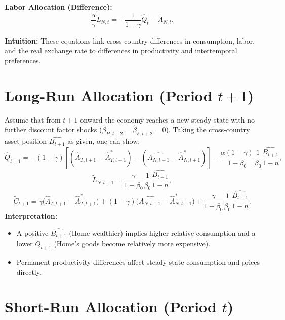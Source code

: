 \documentclass[a4paper,12pt]{article} %
\theoremstyle{nonitalic}
\begin{document}
\textbf{Labor Allocation (Difference):}
\[
\frac{\alpha}{\gamma} \tilde{L}_{N,t} = -\frac{1}{1-\gamma} \hat{Q}_t - \tilde{A}_{N,t}. \tag{9d}
\]

\textbf{Intuition:} These equations link cross-country differences in consumption, labor, and the real exchange rate to differences in productivity and intertemporal preferences.

\section{Long-Run Allocation (Period $t+1$)}

Assume that from $ t+1 $ onward the economy reaches a new steady state with no further discount factor shocks ($ \hat{\beta}_{H,t+2} = \hat{\beta}_{F,t+2} = 0 $). Taking the cross-country asset position $ \widehat{B_{t+1}} $ as given, one can show:
\[
\hat{Q}_{t+1} = - (1-\gamma)\left[(\hat{A}_{T,t+1}-\hat{A}^*_{T,t+1}) - ( \widehat{A_{N,t+1}}-\hat{A}^*_{N,t+1})\right] - \frac{\alpha(1-\gamma)}{1-\beta_0}\frac{1}{\beta_0}\frac{\widehat{B_{t+1}}}{1-n},
\]
\[
\tilde{L}_{N,t+1} = \frac{\gamma}{1-\beta_0}\frac{1}{\beta_0}\frac{\widehat{B_{t+1}}}{1-n},
\]
\[
\tilde{C}_{t+1} = \gamma\big(\hat{A}_{T,t+1}-\hat{A}^*_{T,t+1}\big) + (1-\gamma)\big( \widehat{A_{N,t+1}}-\hat{A}^*_{N,t+1}\big) + \frac{\gamma}{1-\beta_0}\frac{1}{\beta_0}\frac{\widehat{B_{t+1}}}{1-n}.
\]
\textbf{Interpretation:}
\begin{itemize}
    \item A positive $ \widehat{B_{t+1}} $ (Home wealthier) implies higher relative consumption and a lower $ Q_{t+1} $ (Home’s goods become relatively more expensive).
    \item Permanent productivity differences affect steady state consumption and prices directly.
\end{itemize}

\section{Short-Run Allocation (Period $t$)}
\end{document}
